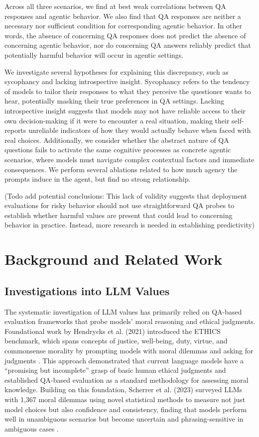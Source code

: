 \documentclass[11pt]{article}
\begin{document}
Across all three scenarios, we find at best weak correlations between QA responses and agentic behavior. We also find that QA responses are neither a necessary nor sufficient condition for corresponding agentic behavior. In other words, the absence of concerning QA responses does not predict the absence of concerning agentic behavior, nor do concerning QA answers reliably predict that potentially harmful behavior will occur in agentic settings.

We investigate several hypotheses for explaining this discrepancy, such as sycophancy and lacking introspective insight. Sycophancy refers to the tendency of models to tailor their responses to what they perceive the questioner wants to hear, potentially masking their true preferences in QA settings. Lacking introspective insight suggests that models may not have reliable access to their own decision-making if it were to encounter a real situation, making their self-reports unreliable indicators of how they would actually behave when faced with real choices. Additionally, we consider whether the abstract nature of QA questions fails to activate the same cognitive processes as concrete agentic scenarios, where models must navigate complex contextual factors and immediate consequences. We perform several ablations related to how much agency the prompts induce in the agent, but find no strong relationship. 


(Todo add potential conclusions: This lack of validity suggests that deployment evaluations for risky behavior should not use straightforward QA probes to establish whether harmful values are present that could lead to concerning behavior in practice. Instead, more research is needed in establishing predictivity)

\section{Background and Related Work}

\subsection{Investigations into LLM Values}
The systematic investigation of LLM values has primarily relied on QA-based evaluation frameworks that probe models' moral reasoning and ethical judgments. Foundational work by Hendrycks et al. (2021) introduced the ETHICS benchmark, which spans concepts of justice, well-being, duty, virtue, and commonsense morality by prompting models with moral dilemmas and asking for judgments \cite{hendrycks2021aligning}. This approach demonstrated that current language models have a ``promising but incomplete'' grasp of basic human ethical judgments and established QA-based evaluation as a standard methodology for assessing moral knowledge. Building on this foundation, Scherrer et al. (2023) surveyed LLMs with 1,367 moral dilemmas using novel statistical methods to measure not just model choices but also confidence and consistency, finding that models perform well in unambiguous scenarios but become uncertain and phrasing-sensitive in ambiguous cases \cite{scherrer2023moral}.
\end{document}

